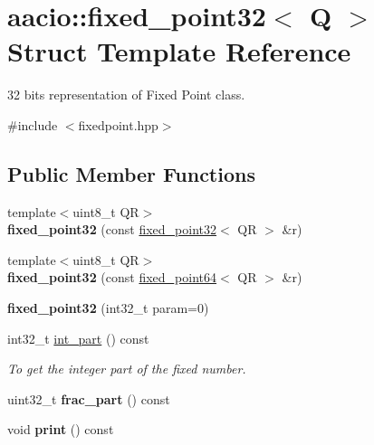 \hypertarget{structaacio_1_1fixed__point32}{}\section{aacio\+:\+:fixed\+\_\+point32$<$ Q $>$ Struct Template Reference}
\label{structaacio_1_1fixed__point32}


32 bits representation of Fixed Point class.  




{\ttfamily \#include $<$fixedpoint.\+hpp$>$}

\subsection*{Public Member Functions}
\begin{DoxyCompactItemize}
\item 
{\footnotesize template$<$uint8\+\_\+t QR$>$ }\\{\bfseries fixed\+\_\+point32} (const \mbox{\hyperlink{structaacio_1_1fixed__point32}{fixed\+\_\+point32}}$<$ QR $>$ \&r)
\item 
{\footnotesize template$<$uint8\+\_\+t QR$>$ }\\{\bfseries fixed\+\_\+point32} (const \mbox{\hyperlink{structaacio_1_1fixed__point64}{fixed\+\_\+point64}}$<$ QR $>$ \&r)
\item 
\mbox{\label{structaacio_1_1fixed__point32_a1e9e2a909ddf575854ddada86e76fb4f}} 
{\bfseries fixed\+\_\+point32} (int32\+\_\+t param=0)
\item 
int32\+\_\+t \mbox{\hyperlink{structaacio_1_1fixed__point32_ae19b9b7a0358872ec7ff7492c77a1694}{int\+\_\+part}} () const
\begin{DoxyCompactList}\small\item\em To get the integer part of the fixed number. \end{DoxyCompactList}\item 
\mbox{\label{structaacio_1_1fixed__point32_a20ae170065a8480bbf4a4ff9fe186a6f}} 
uint32\+\_\+t {\bfseries frac\+\_\+part} () const
\item 
\mbox{\label{structaacio_1_1fixed__point32_afe7a77130b3b4097440c3eb894c5cfc3}} 
void {\bfseries print} () const
\item 

\end{DoxyCompactItemize}
